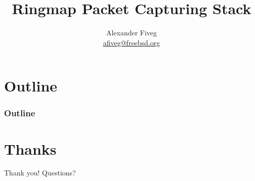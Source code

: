\documentclass{beamer}
\title{Ringmap Packet Capturing Stack}
\author[Alexander Fiveg]{ Alexander Fiveg \\
\url{afiveg@freebsd.org} }
\begin{document}
\frame{\titlepage}


\section*{Outline}
\begin{frame}
\frametitle{Outline}
\tableofcontents
\end{frame}











\section*{Thanks}
\begin{frame}
	\begin{center}
	\huge{Thank you! Questions?}
	\end{center}
\end{frame}
\end{document}
